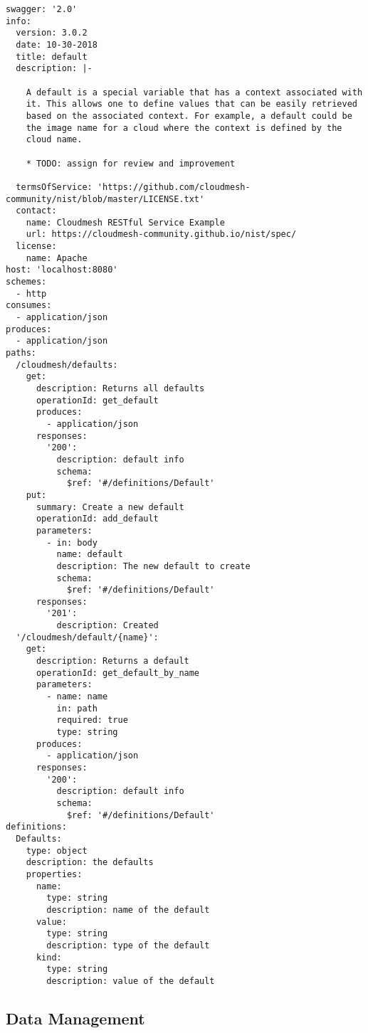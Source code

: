 \documentclass[9pt,]{article}
\begin{document}
\begin{verbatim}
swagger: '2.0'
info:
  version: 3.0.2
  date: 10-30-2018
  title: default
  description: |-
  
    A default is a special variable that has a context associated with
    it. This allows one to define values that can be easily retrieved
    based on the associated context. For example, a default could be
    the image name for a cloud where the context is defined by the
    cloud name.

    * TODO: assign for review and improvement
    
  termsOfService: 'https://github.com/cloudmesh-community/nist/blob/master/LICENSE.txt'
  contact:
    name: Cloudmesh RESTful Service Example
    url: https://cloudmesh-community.github.io/nist/spec/
  license:
    name: Apache
host: 'localhost:8080'
schemes:
  - http
consumes:
  - application/json
produces:
  - application/json
paths:
  /cloudmesh/defaults:
    get:
      description: Returns all defaults
      operationId: get_default
      produces:
        - application/json
      responses:
        '200':
          description: default info
          schema:
            $ref: '#/definitions/Default'
    put:
      summary: Create a new default
      operationId: add_default
      parameters:
        - in: body
          name: default
          description: The new default to create
          schema:
            $ref: '#/definitions/Default'
      responses:
        '201':
          description: Created
  '/cloudmesh/default/{name}':
    get:
      description: Returns a default
      operationId: get_default_by_name
      parameters:
        - name: name
          in: path
          required: true
          type: string
      produces:
        - application/json
      responses:
        '200':
          description: default info
          schema:
            $ref: '#/definitions/Default'
definitions:
  Defaults:
    type: object
    description: the defaults
    properties:
      name:
        type: string
        description: name of the default
      value:
        type: string
        description: type of the default
      kind:
        type: string
        description: value of the default
\end{verbatim}

\hypertarget{data-management}{%
\subsection{Data Management}\label{data-management}}
\end{document}
